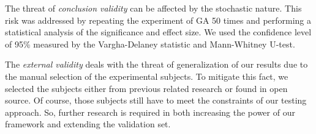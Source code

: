 The threat of \emph{conclusion validity} can be affected by the stochastic nature. This risk was addressed by repeating the experiment of GA 50 times and performing a statistical analysis of the significance and effect size. We used the confidence level of 95\% measured by the Vargha-Delaney statistic and Mann-Whitney U-test.

The \emph{external validity} deals with the threat of generalization of our results due to the manual selection of the experimental subjects. To mitigate this fact, we selected the subjects either from previous  related research or found in open source. Of course, those subjects still have to meet the constraints of our testing approach. So, further research is required in both increasing the power of our framework and extending the validation set.
